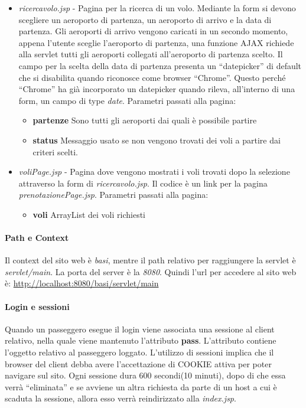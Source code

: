 \documentclass[a4paper,10pt]{article}
\begin{document}
\begin{itemize}
 \item \textit{ricercavolo.jsp} - Pagina per la ricerca di un volo. Mediante la form si devono scegliere un aeroporto di partenza, un aeroporto di arrivo e la data 
				 di partenza. 
				 Gli aeroporti di arrivo vengono caricati in un secondo momento, appena l'utente sceglie l'aeroporto di partenza, una funzione AJAX richiede alla servlet tutti gli
				 aeroporti collegati all'aeroporto di partenza scelto.
				 Il campo per la scelta della data di partenza presenta un ``datepicker'' di default che si disabilita quando riconosce come browser ``Chrome''. Questo perch\'e 
				 ``Chrome'' ha gi\`a incorporato un datepicker quando rileva, all'interno di una form, un campo di type \textit{date}.
 			Parametri passati alla pagina:
			\begin{itemize}
			 \item \textbf{partenze} Sono tutti gli aeroporti dai quali \`e possibile partire
			 \item \textbf{status} Messaggio usato se non vengono trovati dei voli a partire dai criteri scelti.
			\end{itemize}
			
 \item \textit{voliPage.jsp} - Pagina dove vengono mostrati i voli trovati dopo la selezione attraverso la form di \textit{ricercavolo.jsp}. Il codice \`e un link per la pagina \textit{prenotazionePage.jsp}.
 			Parametri passati alla pagina:
			\begin{itemize}
			\item \textbf{voli} ArrayList dei voli richiesti 
			\end{itemize}
\end{itemize}

\paragraph{Path e Context}
Il context del sito web \`e \textit{basi}, mentre il path relativo per raggiungere la servlet \`e \textit{servlet/main}. La porta del server \`e la \textit{8080}.
Quindi l'url per accedere al sito web \`e: \url{http://localhost:8080/basi/servlet/main}

\paragraph{Login e sessioni}
Quando un passeggero esegue il login viene associata una sessione al client relativo, nella quale viene mantenuto
l'attributo \textbf{pass}. L'attributo contiene l'oggetto relativo al passeggero loggato.
L'utilizzo di sessioni implica che il browser del client debba avere l'accettazione 
di COOKIE attiva per poter navigare sul sito.
Ogni sessione dura 600 secondi(10 minuti), dopo di che  essa verr\`a ``eliminata'' e se 
avviene   un   altra   richiesta   da   parte   di   un   host   a   cui   \`e   scaduta   la   sessione,   allora   esso   verr\`a 
reindirizzato alla \textit{index.jsp}.
\end{document}
